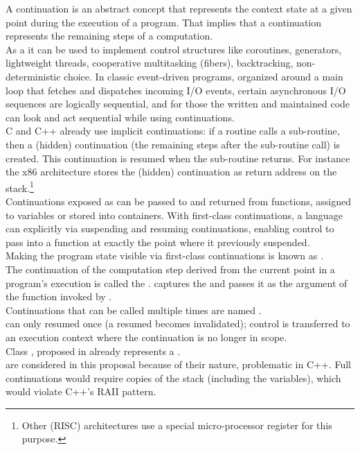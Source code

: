 
A continuation is an abstract concept that represents the context state at a
given point during the execution of a program. That implies that a continuation
represents the remaining steps of a computation.\\

As a  it can be used to implement control
structures like coroutines,  generators, lightweight threads, cooperative
multitasking (fibers), backtracking, non-deterministic choice. In classic
event-driven programs, organized around a main loop that fetches and dispatches
incoming I/O events, certain asynchronous I/O sequences are logically
sequential, and for those the written and maintained code can look and act
sequential while using continuations.\\

C and C++ already use implicit continuations: if a routine calls a sub-routine,
then a (hidden) continuation (the remaining steps after the sub-routine call) is
created. This continuation is resumed when the sub-routine returns. For
instance the x86 architecture stores the (hidden) continuation as return address
on the stack.\footnote{Other (RISC) architectures use a special micro-processor
register for this purpose.}\\

Continuations exposed as  can be passed to and
returned from functions, assigned to variables or stored into containers. With
first-class continuations, a language can explicitly  via suspending and resuming continuations, enabling control to pass
into a function at exactly the point where it previously suspended.\\
Making the program state visible via first-class continuations is known as
.\\

The continuation of the computation step derived from the current point in a
program's execution is called the . \cc captures the
 and passes it as the argument of the function invoked by
\cc.\\

Continuations that can be called multiple times are named
.\\
 can only resumed once (a resumed 
 becomes invalidated); control is transferred to
an execution context where the continuation is no longer in scope.\\
Class , proposed in \cite{P0099R1}
already represents a .\\
 are  considered in this proposal because of
their nature, problematic in C++. Full continuations would require copies of
the stack (including the variables), which would violate C++'s RAII pattern.\\

